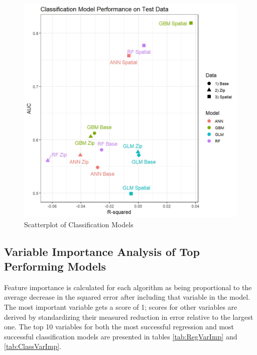 \documentclass[12pt,]{article}
\begin{document}
\begin{figure}[H]
\includegraphics[width=1\linewidth]{Sections/tables and figures/class_model_results_scatterplot} \caption{Scatterplot of Classification Models}\label{fig:Class Models Scatterplot}
\end{figure}

\hypertarget{variable-importance-analysis-of-top-performing-models}{%
\subsection{Variable Importance Analysis of Top Performing
Models}\label{variable-importance-analysis-of-top-performing-models}}

Feature importance is calculated for each algorithm as being
proportional to the average decrease in the squared error after
including that variable in the model. The most important variable gets a
score of 1; scores for other variables are derived by standardizing
their measured reduction in error relative to the largest one. The top
10 variables for both the most successful regression and most successful
classification models are presented in tables \ref{tab:RegVarImp} and
\ref{tab:ClassVarImp}.
\end{document}
